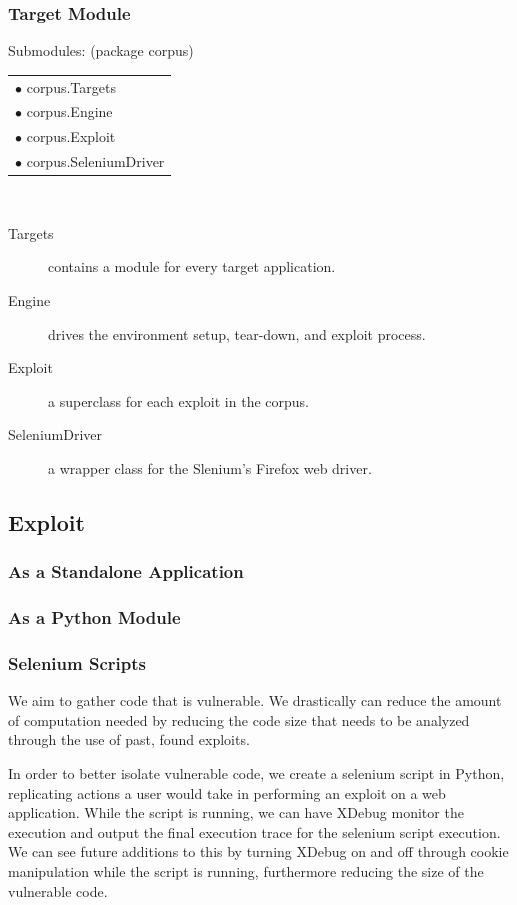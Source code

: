 \documentclass[letterpaper,twocolumn,10pt]{article}
\begin{document}
\subsubsection{Target Module}

Submodules: (package corpus)\\
 \begin{tabular}{ l }
   $\bullet$ corpus.Targets\\
   $\bullet$ corpus.Engine\\
   $\bullet$ corpus.Exploit\\
   $\bullet$ corpus.SeleniumDriver\\
 \end{tabular}\\

 \begin{description}
   \item[Targets] contains a module for every target application.
   \item[Engine] drives the environment setup, tear-down, and exploit process.
   \item[Exploit] a superclass for each exploit in the corpus.
   \item[SeleniumDriver] a wrapper class for the Slenium's Firefox web driver.
 \end{description}

\subsection{Exploit}

\subsubsection{As a Standalone Application}

\subsubsection{As a Python Module}

\subsubsection{Selenium Scripts}

We aim to gather code that is vulnerable.  We drastically can reduce the amount of computation needed by reducing the code size that needs to be analyzed through the use of past, found exploits.  

In order to better isolate vulnerable code, we create a selenium script in Python, replicating actions a user would take in performing an exploit on a web application.  While the script is running, we can have XDebug monitor the execution and output the final execution trace for the selenium script execution.  We can see future additions to this by turning XDebug on and off through cookie manipulation while the script is running, furthermore reducing the size of the vulnerable code.
\end{document}
